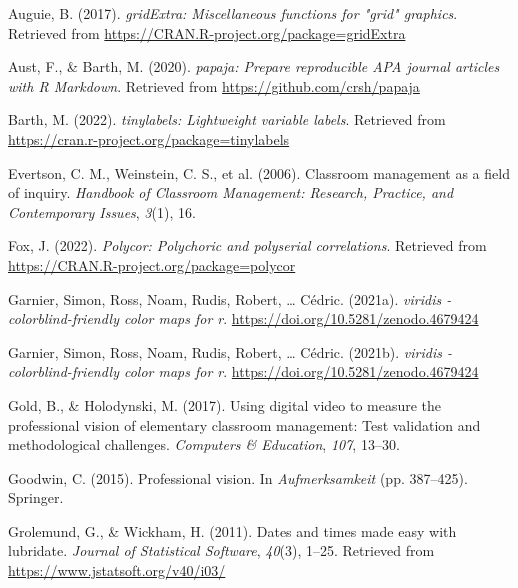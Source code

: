 \documentclass[
  man,floatsintext]{apa6}
\newlength{\cslhangindent}
\newlength{\cslentryspacingunit} %
\newenvironment{CSLReferences}[2] %
 {%
  \setlength{\parindent}{0pt}
  \ifodd #1
  \let\oldpar\par
  \def\par{\hangindent=\cslhangindent\oldpar}
  \fi
  \setlength{\parskip}{#2\cslentryspacingunit}
 }%
 {}
\begin{document}
\hypertarget{refs}{}
\begin{CSLReferences}{1}{0}
\leavevmode{}%
Auguie, B. (2017). \emph{gridExtra: Miscellaneous functions for "grid" graphics}. Retrieved from \url{https://CRAN.R-project.org/package=gridExtra}

\leavevmode{}%
Aust, F., \& Barth, M. (2020). \emph{{papaja}: {Prepare} reproducible {APA} journal articles with {R Markdown}}. Retrieved from \url{https://github.com/crsh/papaja}

\leavevmode{}%
Barth, M. (2022). \emph{{tinylabels}: Lightweight variable labels}. Retrieved from \url{https://cran.r-project.org/package=tinylabels}

\leavevmode{}%
Evertson, C. M., Weinstein, C. S., et al. (2006). Classroom management as a field of inquiry. \emph{Handbook of Classroom Management: Research, Practice, and Contemporary Issues}, \emph{3}(1), 16.

\leavevmode{}%
Fox, J. (2022). \emph{Polycor: Polychoric and polyserial correlations}. Retrieved from \url{https://CRAN.R-project.org/package=polycor}

\leavevmode{}%
Garnier, Simon, Ross, Noam, Rudis, Robert, \ldots{} Cédric. (2021a). \emph{{viridis} - colorblind-friendly color maps for r}. \url{https://doi.org/10.5281/zenodo.4679424}

\leavevmode{}%
Garnier, Simon, Ross, Noam, Rudis, Robert, \ldots{} Cédric. (2021b). \emph{{viridis} - colorblind-friendly color maps for r}. \url{https://doi.org/10.5281/zenodo.4679424}

\leavevmode{}%
Gold, B., \& Holodynski, M. (2017). Using digital video to measure the professional vision of elementary classroom management: Test validation and methodological challenges. \emph{Computers \& Education}, \emph{107}, 13--30.

\leavevmode{}%
Goodwin, C. (2015). Professional vision. In \emph{Aufmerksamkeit} (pp. 387--425). Springer.

\leavevmode{}%
Grolemund, G., \& Wickham, H. (2011). Dates and times made easy with {lubridate}. \emph{Journal of Statistical Software}, \emph{40}(3), 1--25. Retrieved from \url{https://www.jstatsoft.org/v40/i03/}


\end{CSLReferences}
\end{document}
